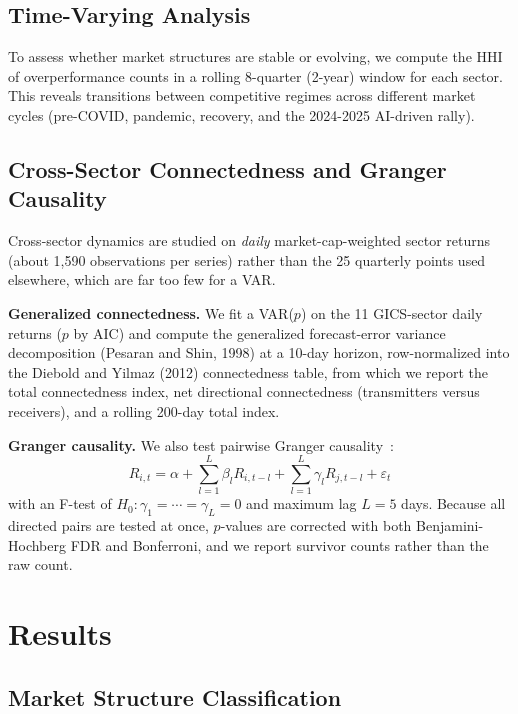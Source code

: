\documentclass[11pt]{article}
\begin{document}
\subsection{Time-Varying Analysis}

To assess whether market structures are stable or evolving, we compute the HHI of overperformance counts in a rolling 8-quarter (2-year) window for each sector. This reveals transitions between competitive regimes across different market cycles (pre-COVID, pandemic, recovery, and the 2024-2025 AI-driven rally).

\subsection{Cross-Sector Connectedness and Granger Causality}

Cross-sector dynamics are studied on \emph{daily} market-cap-weighted sector returns (about 1,590 observations per series) rather than the 25 quarterly points used elsewhere, which are far too few for a VAR.

\textbf{Generalized connectedness.} We fit a VAR($p$) on the 11 GICS-sector daily returns ($p$ by AIC) and compute the generalized forecast-error variance decomposition (Pesaran and Shin, 1998) at a 10-day horizon, row-normalized into the Diebold and Yilmaz (2012) connectedness table, from which we report the total connectedness index, net directional connectedness (transmitters versus receivers), and a rolling 200-day total index.

\textbf{Granger causality.} We also test pairwise Granger causality~\cite{granger1969}:
\begin{equation}
    R_{i,t} = \alpha + \sum_{l=1}^{L} \beta_l R_{i,t-l} + \sum_{l=1}^{L} \gamma_l R_{j,t-l} + \varepsilon_t
\end{equation}
with an F-test of $H_0: \gamma_1 = \cdots = \gamma_L = 0$ and maximum lag $L = 5$ days. Because all directed pairs are tested at once, $p$-values are corrected with both Benjamini-Hochberg FDR and Bonferroni, and we report survivor counts rather than the raw count.

\section{Results}

\subsection{Market Structure Classification}
\end{document}
